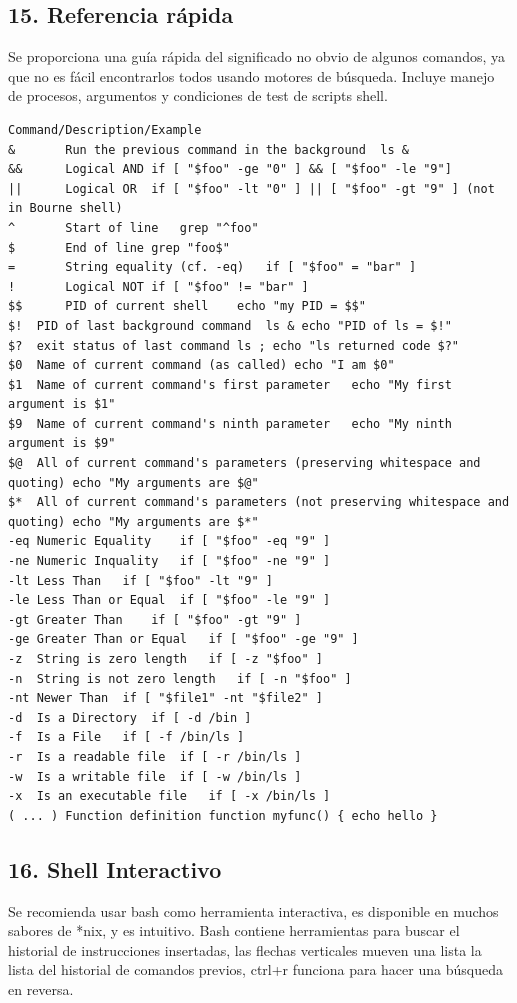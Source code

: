 \documentclass[a4paper]{article}
\begin{document}
\subsection*{15. Referencia rápida}

Se proporciona una guía rápida del significado no obvio de algunos comandos, ya que no es fácil encontrarlos todos usando motores de búsqueda. Incluye manejo de procesos, argumentos y condiciones de test de scripts shell.

\begin{verbatim}
Command/Description/Example
&		Run the previous command in the background	ls &
&&		Logical AND	if [ "$foo" -ge "0" ] && [ "$foo" -le "9"]
||		Logical OR	if [ "$foo" -lt "0" ] || [ "$foo" -gt "9" ] (not in Bourne shell)
^		Start of line	grep "^foo"
$		End of line	grep "foo$"
=		String equality (cf. -eq)	if [ "$foo" = "bar" ]
!		Logical NOT	if [ "$foo" != "bar" ]
$$		PID of current shell	echo "my PID = $$"
$!	PID of last background command	ls & echo "PID of ls = $!"
$?	exit status of last command	ls ; echo "ls returned code $?"
$0	Name of current command (as called)	echo "I am $0"
$1	Name of current command's first parameter	echo "My first argument is $1"
$9	Name of current command's ninth parameter	echo "My ninth argument is $9"
$@	All of current command's parameters (preserving whitespace and quoting)	echo "My arguments are $@"
$*	All of current command's parameters (not preserving whitespace and quoting)	echo "My arguments are $*"
-eq	Numeric Equality	if [ "$foo" -eq "9" ]
-ne	Numeric Inquality	if [ "$foo" -ne "9" ]
-lt	Less Than	if [ "$foo" -lt "9" ]
-le	Less Than or Equal	if [ "$foo" -le "9" ]
-gt	Greater Than	if [ "$foo" -gt "9" ]
-ge	Greater Than or Equal	if [ "$foo" -ge "9" ]
-z	String is zero length	if [ -z "$foo" ]
-n	String is not zero length	if [ -n "$foo" ]
-nt	Newer Than	if [ "$file1" -nt "$file2" ]
-d	Is a Directory	if [ -d /bin ]
-f	Is a File	if [ -f /bin/ls ]
-r	Is a readable file	if [ -r /bin/ls ]
-w	Is a writable file	if [ -w /bin/ls ]
-x	Is an executable file	if [ -x /bin/ls ]
( ... )	Function definition	function myfunc() { echo hello }
\end{verbatim}

\subsection*{16. Shell Interactivo}

Se recomienda usar bash como herramienta interactiva, es disponible en muchos sabores de *nix, y es intuitivo. Bash contiene herramientas para buscar el historial de instrucciones insertadas, las flechas verticales mueven una lista la lista del historial de comandos previos, ctrl+r funciona para hacer una búsqueda en reversa.
\end{document}

